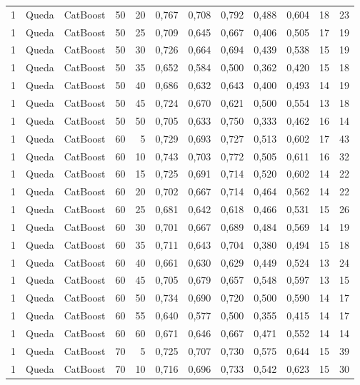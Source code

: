 \begin{longtable}{@{}rllrrrrrrrrr@{}}
1 & Queda & CatBoost & 50 & 20 & 0,767 & 0,708 & 0,792 & 0,488 & 0,604 & 18 & 23 \\
1 & Queda & CatBoost & 50 & 25 & 0,709 & 0,645 & 0,667 & 0,406 & 0,505 & 17 & 19 \\
1 & Queda & CatBoost & 50 & 30 & 0,726 & 0,664 & 0,694 & 0,439 & 0,538 & 15 & 19 \\
1 & Queda & CatBoost & 50 & 35 & 0,652 & 0,584 & 0,500 & 0,362 & 0,420 & 15 & 18 \\
1 & Queda & CatBoost & 50 & 40 & 0,686 & 0,632 & 0,643 & 0,400 & 0,493 & 14 & 19 \\
1 & Queda & CatBoost & 50 & 45 & 0,724 & 0,670 & 0,621 & 0,500 & 0,554 & 13 & 18 \\
1 & Queda & CatBoost & 50 & 50 & 0,705 & 0,633 & 0,750 & 0,333 & 0,462 & 16 & 14 \\
1 & Queda & CatBoost & 60 & 5 & 0,729 & 0,693 & 0,727 & 0,513 & 0,602 & 17 & 43 \\
1 & Queda & CatBoost & 60 & 10 & 0,743 & 0,703 & 0,772 & 0,505 & 0,611 & 16 & 32 \\
1 & Queda & CatBoost & 60 & 15 & 0,725 & 0,691 & 0,714 & 0,520 & 0,602 & 14 & 22 \\
1 & Queda & CatBoost & 60 & 20 & 0,702 & 0,667 & 0,714 & 0,464 & 0,562 & 14 & 22 \\
1 & Queda & CatBoost & 60 & 25 & 0,681 & 0,642 & 0,618 & 0,466 & 0,531 & 15 & 26 \\
1 & Queda & CatBoost & 60 & 30 & 0,701 & 0,667 & 0,689 & 0,484 & 0,569 & 14 & 19 \\
1 & Queda & CatBoost & 60 & 35 & 0,711 & 0,643 & 0,704 & 0,380 & 0,494 & 15 & 18 \\
1 & Queda & CatBoost & 60 & 40 & 0,661 & 0,630 & 0,629 & 0,449 & 0,524 & 13 & 24 \\
1 & Queda & CatBoost & 60 & 45 & 0,705 & 0,679 & 0,657 & 0,548 & 0,597 & 13 & 15 \\
1 & Queda & CatBoost & 60 & 50 & 0,734 & 0,690 & 0,720 & 0,500 & 0,590 & 14 & 17 \\
1 & Queda & CatBoost & 60 & 55 & 0,640 & 0,577 & 0,500 & 0,355 & 0,415 & 14 & 17 \\
1 & Queda & CatBoost & 60 & 60 & 0,671 & 0,646 & 0,667 & 0,471 & 0,552 & 14 & 14 \\
1 & Queda & CatBoost & 70 & 5 & 0,725 & 0,707 & 0,730 & 0,575 & 0,644 & 15 & 39 \\
1 & Queda & CatBoost & 70 & 10 & 0,716 & 0,696 & 0,733 & 0,542 & 0,623 & 15 & 30 \\

\end{longtable}
